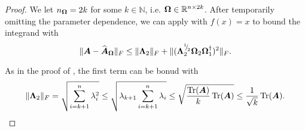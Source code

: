 \documentclass[12pt]{article}
\begin{document}
\begin{proof}
    We let $n_{\boldsymbol{\Omega}} = 2k$ for some $k \in \mathbb{N}$, i.e. $\boldsymbol{\Omega} \in \mathbb{R}^{n \times 2k}$. After temporarily omitting the parameter dependence, we can apply \cite[theorem B.1]{persson-2023-randomized-lowrank} with $f(x) = x$ to bound the integrand with%
    \begin{equation}
        \lVert \boldsymbol{A} - \widehat{\boldsymbol{A}}_{\boldsymbol{\Omega}} \rVert _F 
        \leq  \lVert \boldsymbol{\Lambda}_2 \rVert _F + \lVert (\boldsymbol{\Lambda}_2^{{}^{1}{\mskip -5mu/\mskip -3mu}_{2}} \boldsymbol{\Omega}_2 \boldsymbol{\Omega}_1^{\dagger} )^2 \rVert _F.
        \label{equ:nystrom-proof-persson-bonud}
    \end{equation}
    
    As in the proof of \cite[lemma 3]{meyer-2021-hutch-optimal}, the first term can be bonud with
    \begin{equation}
        \lVert \boldsymbol{\Lambda}_2 \rVert _F
        = \sqrt{\sum_{i=k+1}^{n} \lambda_i^2}
        \leq \sqrt{ \lambda_{k+1} \sum_{i=k+1}^{n} \lambda_i}
        \leq \sqrt{ \frac{\operatorname{Tr}(\boldsymbol{A})}{k} \operatorname{Tr}(\boldsymbol{A})}
        \leq \frac{1}{\sqrt{k}} \operatorname{Tr}(\boldsymbol{A}).
        \label{equ:nystrom-proof-frobenius-trace}
    \end{equation}


\end{proof}
\end{document}
